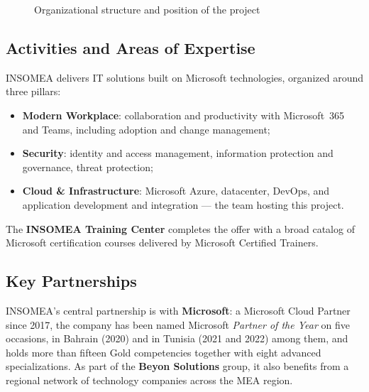 \begin{figure}[H]\centering
{}
\caption{Organizational structure and position of the project}
\label{fig:org-structure}
\end{figure}

\subsection{Activities and Areas of Expertise}
INSOMEA delivers IT solutions built on Microsoft technologies, organized around
three pillars:
\begin{itemize}[leftmargin=1.4em]
  \item \textbf{Modern Workplace}: collaboration and productivity with
        Microsoft~365 and Teams, including adoption and change management;
  \item \textbf{Security}: identity and access management, information
        protection and governance, threat protection;
  \item \textbf{Cloud \& Infrastructure}: Microsoft Azure, datacenter, DevOps,
        and application development and integration --- the team hosting this
        project.
\end{itemize}
The \textbf{INSOMEA Training Center} completes the offer with a broad catalog
of Microsoft certification courses delivered by Microsoft Certified Trainers.

\subsection{Key Partnerships}
INSOMEA's central partnership is with \textbf{Microsoft}: a Microsoft Cloud
Partner since 2017, the company has been named Microsoft \emph{Partner of the
Year} on five occasions, in Bahrain (2020) and in Tunisia (2021 and 2022)
among them, and holds more than fifteen Gold competencies together with eight
advanced specializations. As part of the \textbf{Beyon Solutions} group, it
also benefits from a regional network of technology companies across the MEA
region.

